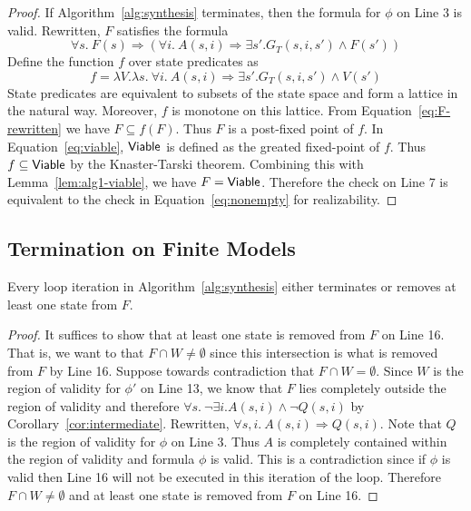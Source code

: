 \begin{proof}
If Algorithm~\ref{alg:synthesis} terminates, then the
formula for $\phi$ on Line 3 is valid. Rewritten, $F$
satisfies the formula
\begin{equation}
  \forall s.~F(s) \Rightarrow \left(\forall i.~ A(s,i) \Rightarrow \exists
    s'.G_{T}(s,i,s') \land F(s')\right)
  \label{eq:F-rewritten}
\end{equation}
Define the function $f$ over state predicates as
  \begin{equation}
    f = \lambda V. \lambda s.~ \forall i.~ A(s,i) \Rightarrow \exists s'.G_{T}(s,i,s') \land V(s')
    \label{eq:f-fixed-point}
  \end{equation}
  State predicates are equivalent to subsets of the state space and
  form a lattice in the natural way. Moreover, $f$ is monotone on this
  lattice. From Equation~\ref{eq:F-rewritten} we have
  $F \subseteq f(F)$. Thus $F$ is a post-fixed point of $f$. In
  Equation~\ref{eq:viable}, ${\mathsf {Viable}}$ is defined as the greated
  fixed-point of $f$. Thus $f \subseteq {\mathsf {Viable}}$ by the Knaster-Tarski
  theorem. Combining this with Lemma~\ref{lem:alg1-viable}, we have
  $F = {\mathsf {Viable}}$. Therefore the check on Line 7 is equivalent to the
  check in Equation~\ref{eq:nonempty} for realizability.
\end{proof}

\subsection{Termination on Finite Models}

\begin{lemma}
Every loop iteration in Algorithm~\ref{alg:synthesis} either
terminates or removes at least one state from $F$.
\label{lem:progress}
\end{lemma}
\begin{proof}
  It suffices to show that at least one state is removed from $F$ on
  Line 16. That is, we want to that $F \cap W \neq \emptyset$ since
  this intersection is what is removed from $F$ by Line 16. Suppose
  towards contradiction that $F \cap W = \emptyset$. Since $W$ is the
  region of validity for $\phi'$ on Line 13, we know that $F$ lies
  completely outside the region of validity and therefore
  $\forall s.~ \neg \exists i. A(s,i) \land \neg Q(s, i)$
  by Corollary~\ref{cor:intermediate}. Rewritten,
  $\forall s, i.~ A(s, i) \Rightarrow Q(s, i)$. Note that $Q$ is the
  region of validity for $\phi$ on Line 3. Thus $A$ is completely
  contained within the region of validity and formula $\phi$ is valid.
  This is a contradiction since if $\phi$ is valid then Line 16 will
  not be executed in this iteration of the loop. Therefore
  $F \cap W \neq \emptyset$ and at least one state is removed from $F$
  on Line 16.
\end{proof}

